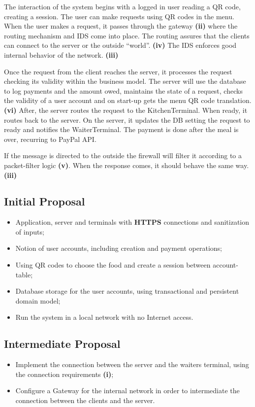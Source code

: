 \documentclass[12pt,paper=a4]{article}
\begin{document}
The interaction of the system begins with a logged in user reading a QR code, creating a session. The user can make requests using QR codes in the menu. When the user makes a request, it passes through the gateway \textbf{(ii)} where the routing mechanism and IDS come into place. The routing assures that the clients can connect to the server or the outside “world”. \textbf{(iv)} The IDS enforces good internal behavior of the network. \textbf{(iii)}

Once the request from the client reaches the server, it processes the request checking its validity within the business model. The server will use the database to log payments and the amount owed, maintains the state of a request, checks the validity of a user account and on start-up gets the menu QR code translation. \textbf{(vi)} After, the server routes the request to the KitchenTerminal. When ready, it routes back to the server. On the server, it updates the DB setting the request to ready and notifies the WaiterTerminal. The payment is done after the meal is over, recurring to PayPal API.

If the message is directed to the outside the firewall will filter it according to a packet-filter logic \textbf{(v)}. When the response comes, it should behave the same way. \textbf{(iii)}

\subsection{Initial Proposal}
\begin{itemize}
\item[\ding{51}] Application, server and terminals with \textbf{HTTPS} connections and sanitization of inputs;
\item[\ding{51}] Notion of user accounts, including creation and payment operations;
\item[\ding{51}] Using QR codes to choose the food and create a session between account-table;
\item[\ding{51}] Database storage for the user accounts, using transactional and persistent domain model;
\item[\ding{51}] Run the system in a local network with no Internet access.
\end{itemize}

\subsection{Intermediate Proposal}
\begin{itemize}
\item[\ding{51}] Implement the connection between the server and the waiters terminal, using the connection requirements \textbf{(i)};
\item[\ding{51}] Configure a Gateway for the internal network in order to intermediate the connection between the clients and the server.
\end{itemize}
\end{document}
